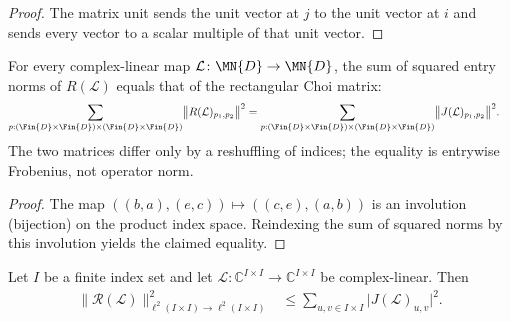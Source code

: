 \begin{proof}
    \leanok
    The matrix unit sends the unit vector at $j$ to the unit vector at $i$ and
    sends every vector to a scalar multiple of that unit vector.
\end{proof}

\begin{lemma}
    \label{thm:gram_reshuffle_matrix_norm_sq}
    \leanok
    For every complex-linear map $\mathcal L\colon\MN{D}\to\MN{D}$, the sum
    of squared entry norms of $R(\mathcal L)$ equals that of the rectangular
    Choi matrix:
    \begin{align}
        \sum_{p:(\Fin{D}\times\Fin{D})\times(\Fin{D}\times\Fin{D})}
        \bigl\|R(\mathcal L)_{p_1,p_2}\bigr\|^2
         & =
        \sum_{p:(\Fin{D}\times\Fin{D})\times(\Fin{D}\times\Fin{D})}
        \bigl\|J(\mathcal L)_{p_1,p_2}\bigr\|^2.
        \label{eq:gram_reshuffle_matrix_norm_sq}
    \end{align}
    The two matrices differ only by a reshuffling of indices; the equality is
    entrywise Frobenius, not operator norm.
\end{lemma}

\begin{proof}
    \leanok
    The map $((b,a),(e,c))\mapsto((c,e),(a,b))$ is an involution (bijection)
    on the product index space.  Reindexing the sum of squared norms by this
    involution yields the claimed equality.
\end{proof}

\begin{lemma}
    \label{thm:gram_reshuffle_norm_sq_le_rectangular_choi}
    \leanok
    Let $I$ be a finite index set and let
    $\mathcal L\colon\mathbb C^{I\times I}\to\mathbb C^{I\times I}$ be
    complex-linear.  Then
    \begin{align}
        \bigl\lVert\mathscr R(\mathcal L)\bigr\rVert_{
            \ell^2(I\times I)\to\ell^2(I\times I)}^2
         & \leq
        \sum_{u,v\in I\times I}
        \bigl\lvert J(\mathcal L)_{u,v}\bigr\rvert^2.
        \label{eq:gram_reshuffle_norm_sq_le_rectangular_choi}
    \end{align}
\end{lemma}

